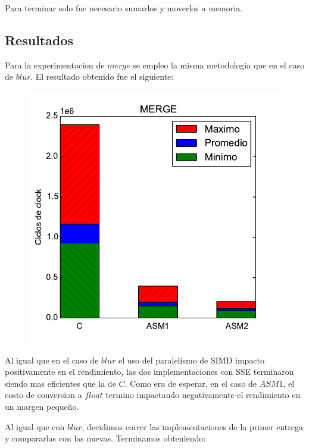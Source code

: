 Para terminar solo fue necesario sumarlos y moverlos a memoria.

\newpage
\subsection{Resultados}
Para la experimentacion de $merge$ se empleo la misma metodologia que en el caso de $blur$. El resultado obtenido fue el siguiente:

\begin{figure}[h!]
	\centering
	\includegraphics[scale=0.45]{images/merge_comparation}
\end{figure}

Al igual que en el caso de $blur$ el uso del paralelismo de SIMD impacto positivamente en el rendimiento, las dos implementaciones con SSE terminaron siendo mas eficientes que la de $C$. Como era de esperar, en el caso de $ASM1$, el costo de conversion a $float$ termino impactando negativamente el rendimiento en un margen pequeño.

Al igual que con $blur$, decidimos correr las implementaciones de la primer entrega y compararlas con las nuevas. Terminamos obteniendo:

